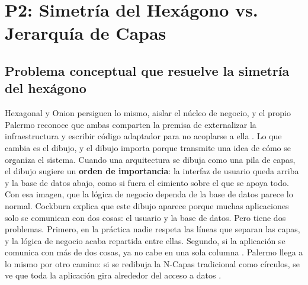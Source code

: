 
\chapter{P2: Simetría del Hexágono vs. Jerarquía de Capas}

\section{Problema conceptual que resuelve la simetría del hexágono}

Hexagonal y Onion persiguen lo mismo, aislar el núcleo de negocio, y el propio Palermo reconoce que ambas comparten la premisa de externalizar la infraestructura y escribir código adaptador para no acoplarse a ella \citep{palermo2008}. Lo que cambia es el dibujo, y el dibujo importa porque transmite una idea de cómo se organiza el sistema. Cuando una arquitectura se dibuja como una pila de capas, el dibujo sugiere un \textbf{orden de importancia}: la interfaz de usuario queda arriba y la base de datos abajo, como si fuera el cimiento sobre el que se apoya todo. Con esa imagen, que la lógica de negocio dependa de la base de datos parece lo normal. Cockburn explica que este dibujo aparece porque muchas aplicaciones solo se comunican con dos cosas: el usuario y la base de datos. Pero tiene dos problemas. Primero, en la práctica nadie respeta las líneas que separan las capas, y la lógica de negocio acaba repartida entre ellas. Segundo, si la aplicación se comunica con más de dos cosas, ya no cabe en una sola columna \citep[«Nature of the Solution»]{cockburn2005}. Palermo llega a lo mismo por otro camino: si se redibuja la N-Capas tradicional como círculos, se ve que toda la aplicación gira alrededor del acceso a datos \citep{palermo2008c}.


